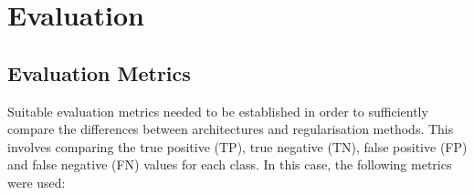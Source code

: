 \documentclass{l4proj}
\begin{document}


\chapter{Evaluation} 


\section{Evaluation Metrics}
Suitable evaluation metrics needed to be established in order to sufficiently compare the differences between architectures and regularisation methods. This involves comparing the true positive (TP), true negative (TN), false positive (FP) and false negative (FN) values for each class. In this case, the following metrics were used:
\end{document}
